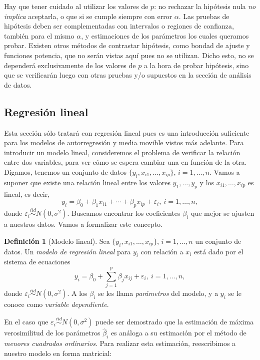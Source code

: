 \documentclass[11pt,letterpaper]{article}
\theoremstyle{definition}
\newtheorem{definition}{Definición}[section]
\theoremstyle{theorem}
\theoremstyle{remark}
\begin{document}
	Hay que tener cuidado al utilizar los valores de \(p\): no rechazar la hipótesis nula \textit{no implica} aceptarla, o que si se cumple siempre con error \(\alpha\). Las pruebas de hipótesis deben ser complementadas con intervalos o regiones de confianza, también para el mismo \(\alpha\), y estimaciones de los parámetros los cuales queramos probar. Existen otros métodos de contrastar hipótesis, como bondad de ajuste y funciones potencia, que no serán vistas aquí pues no se utilizan. Dicho esto, no se dependerá exclusivamente de los valores de \(p\) a la hora de probar hipótesis, sino que se verificarán luego con otras pruebas y/o supuestos en la sección de análisis de datos.
	\subsection{Regresión lineal}
	\noindent\justify Esta sección sólo tratará con regresión lineal pues es una introducción suficiente para los modelos de autorregresión y media movible vistos más adelante. Para introducir un modelo lineal, consideremos el problema de verificar la relación entre dos variables, para ver cómo se espera cambiar una en función de la otra. Digamos, tenemos un conjunto de datos \(\{y_i,x_{i1},\dots,x_{ip}\}\), \(i=1,\dots,n\). Vamos a suponer que existe una relación lineal entre los valores \(y_1,\dots,y_p\) y los \(x_{i1},\dots,x_{ip}\) es lineal, es decir,
	\[y_i=\beta_0+\beta_1x_{i1}+\cdots+\beta_px_{ip}+\varepsilon_i,\ i=1,\dots,n,\]
	donde \(\varepsilon_i\overset{iid}{\sim}N(0,\sigma^2)\). Buscamos encontrar los coeficientes \(\beta_i\) que mejor se ajusten a nuestros datos. Vamos a formalizar este concepto.
	\begin{definition}[Modelo lineal]
		Sea \(\{y_i,x_{i1},\dots,x_{ip}\}\), \(i=1,\dots,n\) un conjunto de datos. Un \textit{modelo de regresión lineal} para \(y_i\) con relación a \(x_i\) está dado por el sistema de ecuaciones \[y_i=\beta_0+\sum_{j=1}^{p}\beta_jx_{ij}+\varepsilon_i,\ i=1,\dots,n,\] donde \(\varepsilon_i\overset{iid}{\sim}N(0,\sigma^2)\). A los \(\beta_i\) se les llama \textit{parámetros} del modelo, y a \(y_i\) se le conoce como \textit{variable dependiente}.
	\end{definition}
	En el caso que \(\varepsilon_i\overset{iid}{\sim}N(0,\sigma^2)\) puede ser demostrado que la estimación de máxima verosimilitud de los parámetros \(\hat{\beta}_i\) es análoga a su estimación por el método de \textit{menores cuadrados ordinarios}. Para realizar esta estimación, reescribimos a nuestro modelo en forma matricial:
\end{document}
